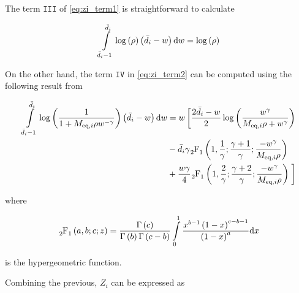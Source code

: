 The term $\mathtt{III}$ of \eqref{eq:zi_term1} is straightforward to calculate

\begin{equation} \label{eq:zi_term3}
    \int\limits_{\bar{d}_i-1}^{\bar{d}_i}\log\left(\rho\right)
    \left(\bar{d}_i-w\right)\text{d} w = \log\left(\rho\right)
\end{equation}

On the other hand, the term $\mathtt{IV}$ in \eqref{eq:zi_term2} can be computed
using the following result from \cite{Wolfram}

\begin{equation} \label{eq:zi_term4}
\begin{aligned}
    \int\limits_{\bar{d}_i-1}^{\bar{d}_i}\log\left(\frac{1}
    {1 + \Meqi\rho w^{-\gamma}}\right)\left(\bar{d}_i - w\right)\dee w &= w\left[\vphantom{\frac{1}{1}}
    \frac{2\bar{d}_i-w}{2}\log\left(\frac{w^{\gamma}}
    {\Meqi\rho + w^{\gamma}}\right)\right.\\
    &-\bar{d}_i\gamma \hgeo\left(1,\frac{1}{\gamma};\frac{\gamma+1}{\gamma};
    \frac{-w^{\gamma}}{\Meqi\rho}\right)\\
    &+\frac{w\gamma}{4}\hgeo\left(1,\frac{2}{\gamma};\frac{\gamma+2}{\gamma};
    \frac{-w^{\gamma}}{\Meqi\rho}\right)
    \left.\vphantom{\frac{1^2}{1}}\right]
\end{aligned}
\end{equation}

\noindent
where

\begin{equation} \label{eq:hypergeometric}
    \hgeo\left(a,b;c;z\right) = \frac{\Gamma\left(c\right)}{\Gamma\left(b\right)
    \Gamma\left(c - b\right)}\int\limits_0^1\frac{x^{b-1}\left(1-x\right)^
    {c-b-1}}{\left(1-x\right)^a}\dee x
\end{equation}

\noindent
is the hypergeometric function.

Combining the previous, $Z_i$ can be expressed as

